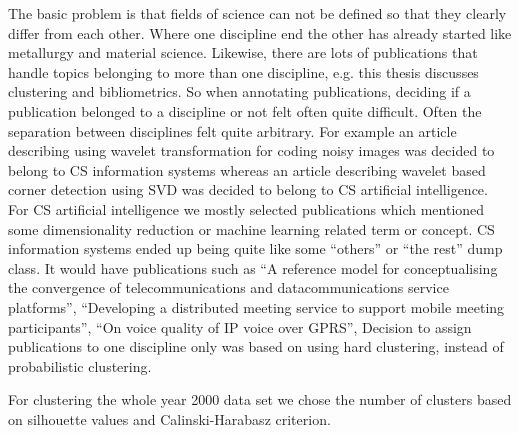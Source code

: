 The basic problem is that fields of science can not be 
defined so that they clearly differ from each other. Where one 
discipline end the other has already started like metallurgy and 
material science. Likewise, there are lots of publications that 
handle topics belonging to more than one discipline, e.g. this 
thesis discusses clustering and bibliometrics. So when annotating 
publications, deciding if a publication belonged to
a discipline or not felt often quite difficult. Often the 
separation between disciplines felt quite arbitrary. For example
an article describing using wavelet transformation for coding noisy
images was decided to belong to CS information systems whereas an
article describing wavelet based corner detection using SVD was
decided to belong to CS artificial intelligence.
For CS artificial intelligence we mostly selected publications 
which mentioned some dimensionality reduction or machine learning 
related term or concept. CS information systems ended up being 
quite like some ``others'' or ``the rest'' dump class.
It would have publications such as
``A reference model for conceptualising the convergence of 
telecommunications and datacommunications service platforms'',
``Developing a distributed meeting service to support mobile 
meeting participants'',
``On voice quality of IP voice over GPRS'',
Decision to assign publications to one discipline only was based 
on using hard clustering, instead of probabilistic clustering. 

For clustering the whole year 2000 data set we chose the number 
of clusters based on silhouette values and Calinski-Harabasz 
criterion.



